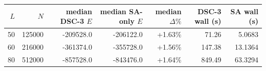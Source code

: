 \begin{tabular}{rrrrrrr}
\toprule
$L$ & $N$ & median DSC-3 $E$ & median SA-only $E$ & median $\Delta\%$ & DSC-3 wall (s) & SA wall (s) \\
\midrule
50 & 125000 & -209528.0 & -206122.0 & +1.63\% & 71.26 & 5.0683 \\
60 & 216000 & -361374.0 & -355728.0 & +1.56\% & 147.38 & 13.1364 \\
80 & 512000 & -857528.0 & -843476.0 & +1.64\% & 849.49 & 63.3294 \\
\bottomrule
\end{tabular}
